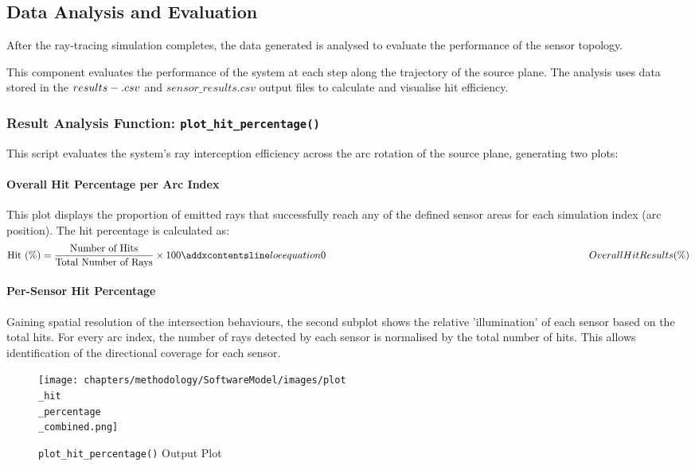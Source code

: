 \subsection{Data Analysis and Evaluation}
After the ray-tracing simulation completes, the data generated is analysed to evaluate the performance of the sensor topology. 

This component evaluates the performance of the system at each step along the trajectory of the source plane. The analysis uses data stored in the $results-\\.csv$ and $sensor\_results.csv$ output files to calculate and visualise hit efficiency. 

\subsubsection{Result Analysis Function: \texttt{plot\_hit\_percentage()}}

This script evaluates the system’s ray interception efficiency across the arc rotation of the source plane, generating two plots:

\paragraph{\textbf{Overall Hit Percentage per Arc Index}}

This plot displays the proportion of emitted rays that successfully reach any of the defined sensor areas for each simulation index (arc position). The hit percentage is calculated as:
\begin{equation}
    \text{Hit (\%)} = \frac{\text{Number of Hits}}{\text{Total Number of Rays}} \times 100
    \label{eq:Overall_Hit_Percentage}
    \addequation{Overall Hit Results (\%)}
    \end{equation}

\paragraph{\textbf{Per-Sensor Hit Percentage}}
Gaining spatial resolution of the intersection behaviours, the second subplot shows the relative 'illumination' of each sensor based on the total hits. For every arc index, the number of rays detected by each sensor is normalised by the total number of hits. This allows identification of the directional coverage for each sensor. 

\begin{figure}[htbp] %
    \centering
    \texttt{[image: chapters/methodology/SoftwareModel/images/plot\\\_hit\\\_percentage\\\_combined.png]} %
    \caption{\texttt{plot\_hit\_percentage()} Output Plot}       %
    \label{fig:Hit Percentage Output Plot}            %
\end{figure}                             %

